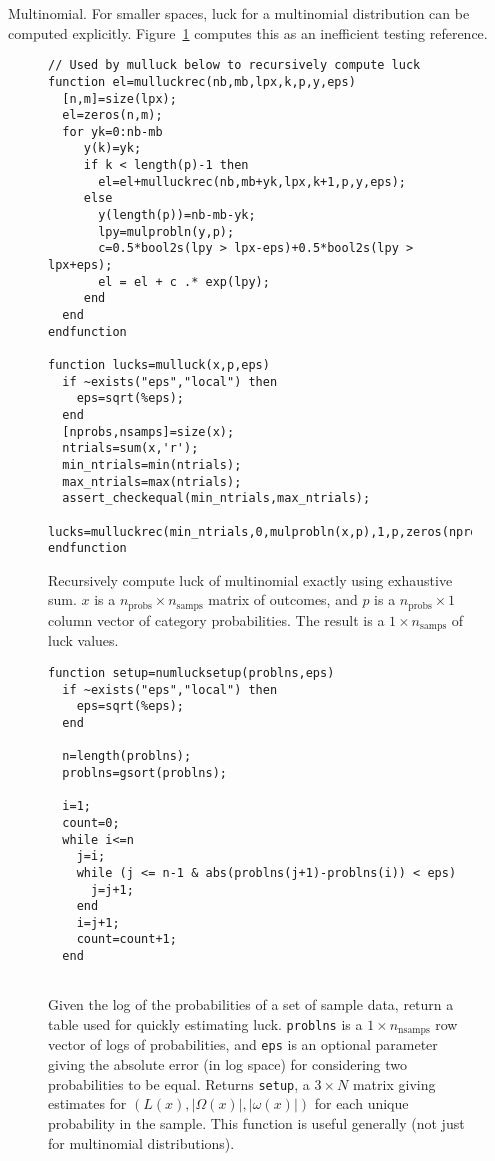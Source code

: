 \begin{example}{Multinomial.}
For smaller spaces, luck for a multinomial distribution can be computed explicitly.  Figure~\ref{fig:mulluck} computes this as an inefficient testing reference.
\begin{figure}
\caption{\label{fig:mulluck}Recursively compute luck of multinomial exactly using exhaustive sum.  $x$ is a $n_{\text{probs}} \times n_{\text{samps}}$ matrix of outcomes, and $p$ is a $n_{\text{probs}} \times 1$ column vector of category probabilities.  The result is a $1 \times n_{\text{samps}}$ of luck values.}
\lstset{language=Scilab}
\begin{lstlisting}
// Used by mulluck below to recursively compute luck
function el=mulluckrec(nb,mb,lpx,k,p,y,eps)
  [n,m]=size(lpx);
  el=zeros(n,m);
  for yk=0:nb-mb
     y(k)=yk;
     if k < length(p)-1 then
       el=el+mulluckrec(nb,mb+yk,lpx,k+1,p,y,eps);
     else
       y(length(p))=nb-mb-yk;
       lpy=mulprobln(y,p);
       c=0.5*bool2s(lpy > lpx-eps)+0.5*bool2s(lpy > lpx+eps);
       el = el + c .* exp(lpy);
     end
  end
endfunction

function lucks=mulluck(x,p,eps)
  if ~exists("eps","local") then
    eps=sqrt(%eps);
  end
  [nprobs,nsamps]=size(x);
  ntrials=sum(x,'r');
  min_ntrials=min(ntrials);
  max_ntrials=max(ntrials);
  assert_checkequal(min_ntrials,max_ntrials);
  lucks=mulluckrec(min_ntrials,0,mulprobln(x,p),1,p,zeros(nprobs,1),eps)
endfunction
\end{lstlisting}
\end{figure}

\begin{figure}
\caption{\label{fig:numlucksetup}Given the log of the probabilities of a set of sample data, return a table used for quickly estimating luck.  {\tt problns} is a $1 \times n_{\text{nsamps}}$ row vector of logs of probabilities, and {\tt eps} is an optional parameter giving the absolute error (in log space) for considering two probabilities to be equal.  Returns {\tt setup}, a $3 \times N$ matrix giving estimates for $(L(x),|\Omega(x)|,|\omega(x)|)$ for each unique probability in the sample.  This function is useful generally (not just for multinomial distributions).}
\lstset{language=Scilab}
\begin{lstlisting}
function setup=numlucksetup(problns,eps)
  if ~exists("eps","local") then
    eps=sqrt(%eps);
  end

  n=length(problns);
  problns=gsort(problns);

  i=1;
  count=0;
  while i<=n
    j=i;
    while (j <= n-1 & abs(problns(j+1)-problns(i)) < eps)  
      j=j+1;
    end
    i=j+1;
    count=count+1;
  end


\end{lstlisting}
\end{figure}
\end{example}
